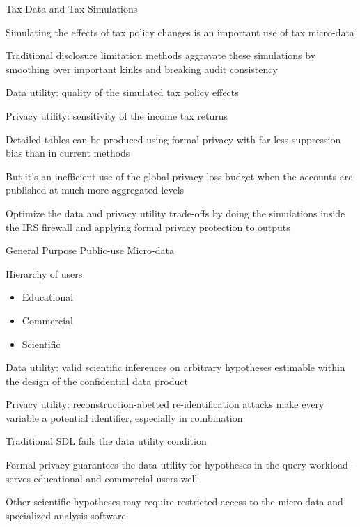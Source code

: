 \begin{frame}{Tax Data and Tax Simulations}
  \begin{wideitemize}
    \item Simulating the effects of tax policy changes is an important use of tax micro-data
    \item Traditional disclosure limitation methods aggravate these simulations by smoothing over important kinks and breaking audit consistency
    \item Data utility: quality of the simulated tax policy effects
    \item Privacy utility: sensitivity of the income tax returns
    \item Detailed tables can be produced using formal privacy with far less suppression bias than in current methods
    \item But it's an inefficient use of the global privacy-loss budget when the accounts are published at much more aggregated levels
    \item Optimize the data and privacy utility trade-offs by doing the simulations inside the IRS firewall and applying formal privacy protection to outputs
  \end{wideitemize}
\end{frame}

\begin{frame}{General Purpose Public-use Micro-data}
  \begin{wideitemize}
    \item Hierarchy of users
    \begin{itemize}
        \item Educational
        \item Commercial
        \item Scientific
    \end{itemize}
    \item Data utility: valid scientific inferences on arbitrary hypotheses estimable within the design of the confidential data product 
    \item Privacy utility: reconstruction-abetted re-identification attacks make every variable a potential identifier, especially in combination
    \item Traditional SDL fails the data utility condition
    \item Formal privacy guarantees the data utility for hypotheses in the query workload--serves educational and commercial users well
    \item Other scientific hypotheses may require restricted-access to the micro-data and specialized analysis software
  \end{wideitemize}
\end{frame}

